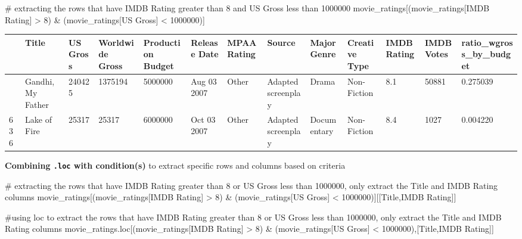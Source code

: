 \documentclass[
  letterpaper,
  DIV=11,
  numbers=noendperiod]{scrreprt}
\newenvironment{Shaded}{\begin{snugshade}}{\end{snugshade}}
\newcommand{\CommentTok}[1]{\textcolor[rgb]{0.37,0.37,0.37}{#1}}
\newcommand{\DecValTok}[1]{\textcolor[rgb]{0.68,0.00,0.00}{#1}}
\newcommand{\NormalTok}[1]{\textcolor[rgb]{0.00,0.23,0.31}{#1}}
\newcommand{\OperatorTok}[1]{\textcolor[rgb]{0.37,0.37,0.37}{#1}}
\newcommand{\StringTok}[1]{\textcolor[rgb]{0.13,0.47,0.30}{#1}}
\begin{document}
\begin{Shaded}
\begin{Highlighting}[]
\CommentTok{\# extracting the rows that have IMDB Rating greater than 8 and US Gross less than 1000000}
\NormalTok{movie\_ratings[(movie\_ratings[}\StringTok{\textquotesingle{}IMDB Rating\textquotesingle{}}\NormalTok{] }\OperatorTok{\textgreater{}} \DecValTok{8}\NormalTok{) }\OperatorTok{\&}\NormalTok{ (movie\_ratings[}\StringTok{\textquotesingle{}US Gross\textquotesingle{}}\NormalTok{] }\OperatorTok{\textless{}} \DecValTok{1000000}\NormalTok{)]}
\end{Highlighting}
\end{Shaded}

\begin{longtable}[]{@{}lllllllllllll@{}}
\toprule\noalign{}
& Title & US Gross & Worldwide Gross & Production Budget & Release Date
& MPAA Rating & Source & Major Genre & Creative Type & IMDB Rating &
IMDB Votes & ratio\_wgross\_by\_budget \\
\midrule\noalign{}
\endhead
\bottomrule\noalign{}
\endlastfoot
21 & Gandhi, My Father & 240425 & 1375194 & 5000000 & Aug 03 2007 &
Other & Adapted screenplay & Drama & Non-Fiction & 8.1 & 50881 &
0.275039 \\
636 & Lake of Fire & 25317 & 25317 & 6000000 & Oct 03 2007 & Other &
Adapted screenplay & Documentary & Non-Fiction & 8.4 & 1027 &
0.004220 \\
\end{longtable}

\textbf{Combining \texttt{.loc} with condition(s)} to extract specific
rows and columns based on criteria

\begin{Shaded}
\begin{Highlighting}[]
\CommentTok{\# extracting the rows that have IMDB Rating greater than 8 or US Gross less than 1000000, only extract the Title and IMDB Rating columns}
\NormalTok{movie\_ratings[(movie\_ratings[}\StringTok{\textquotesingle{}IMDB Rating\textquotesingle{}}\NormalTok{] }\OperatorTok{\textgreater{}} \DecValTok{8}\NormalTok{) }\OperatorTok{\&}\NormalTok{ (movie\_ratings[}\StringTok{\textquotesingle{}US Gross\textquotesingle{}}\NormalTok{] }\OperatorTok{\textless{}} \DecValTok{1000000}\NormalTok{)][[}\StringTok{\textquotesingle{}Title\textquotesingle{}}\NormalTok{,}\StringTok{\textquotesingle{}IMDB Rating\textquotesingle{}}\NormalTok{]]}

\CommentTok{\#using loc to extract the rows that have IMDB Rating greater than 8 or US Gross less than 1000000, only extract the Title and IMDB Rating columns}
\NormalTok{movie\_ratings.loc[(movie\_ratings[}\StringTok{\textquotesingle{}IMDB Rating\textquotesingle{}}\NormalTok{] }\OperatorTok{\textgreater{}} \DecValTok{8}\NormalTok{) }\OperatorTok{\&}\NormalTok{ (movie\_ratings[}\StringTok{\textquotesingle{}US Gross\textquotesingle{}}\NormalTok{] }\OperatorTok{\textless{}} \DecValTok{1000000}\NormalTok{),[}\StringTok{\textquotesingle{}Title\textquotesingle{}}\NormalTok{,}\StringTok{\textquotesingle{}IMDB Rating\textquotesingle{}}\NormalTok{]]}
\end{Highlighting}
\end{Shaded}
\end{document}

